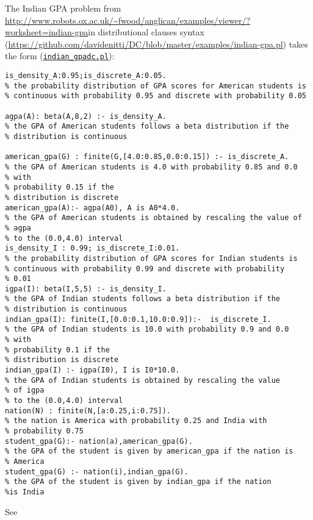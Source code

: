 The Indian GPA problem from \url{http://www.robots.ox.ac.uk/~fwood/anglican/examples/viewer/?worksheet=indian-gpa}in distributional clauses syntax  (\url{https://github.com/davidenitti/DC/blob/master/examples/indian-gpa.pl})
takes the form (\href{http://cplint.lamping.unife.it/example/inference/indian_gpadc.pl}{\texttt{indian\_gpadc.pl}}):
\begin{verbatim}
is_density_A:0.95;is_discrete_A:0.05.
% the probability distribution of GPA scores for American students is
% continuous with probability 0.95 and discrete with probability 0.05

agpa(A): beta(A,8,2) :- is_density_A.
% the GPA of American students follows a beta distribution if the
% distribution is continuous

american_gpa(G) : finite(G,[4.0:0.85,0.0:0.15]) :- is_discrete_A.
% the GPA of American students is 4.0 with probability 0.85 and 0.0
% with 
% probability 0.15 if the
% distribution is discrete
american_gpa(A):- agpa(A0), A is A0*4.0.
% the GPA of American students is obtained by rescaling the value of
% agpa
% to the (0.0,4.0) interval
is_density_I : 0.99; is_discrete_I:0.01.
% the probability distribution of GPA scores for Indian students is
% continuous with probability 0.99 and discrete with probability 
% 0.01
igpa(I): beta(I,5,5) :- is_density_I.
% the GPA of Indian students follows a beta distribution if the
% distribution is continuous
indian_gpa(I): finite(I,[0.0:0.1,10.0:0.9]):-  is_discrete_I.
% the GPA of Indian students is 10.0 with probability 0.9 and 0.0
% with
% probability 0.1 if the
% distribution is discrete
indian_gpa(I) :- igpa(I0), I is I0*10.0.
% the GPA of Indian students is obtained by rescaling the value 
% of igpa
% to the (0.0,4.0) interval
nation(N) : finite(N,[a:0.25,i:0.75]).
% the nation is America with probability 0.25 and India with 
% probability 0.75
student_gpa(G):- nation(a),american_gpa(G).
% the GPA of the student is given by american_gpa if the nation is 
% America
student_gpa(G) :- nation(i),indian_gpa(G).
% the GPA of the student is given by indian_gpa if the nation 
%is India
\end{verbatim}
See 
